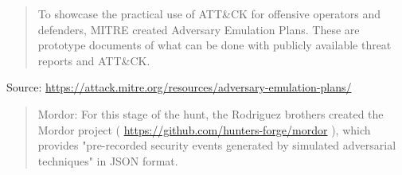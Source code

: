 \documentclass[Screen16to9,17pt]{foils}
\begin{document}


\begin{quote}
To showcase the practical use of ATT\&CK for offensive operators and defenders, MITRE created Adversary Emulation Plans. These are prototype documents of what can be done with publicly available threat reports and ATT\&CK.
\end{quote}
Source: \url{https://attack.mitre.org/resources/adversary-emulation-plans/}





\begin{quote}
Mordor: For this stage of the hunt, the Rodriguez brothers created the Mordor
project ( \url{https://github.com/hunters-forge/mordor} ), which provides
"pre-recorded security events generated by simulated adversarial techniques" in
JSON format.
\end{quote}







\end{document}
